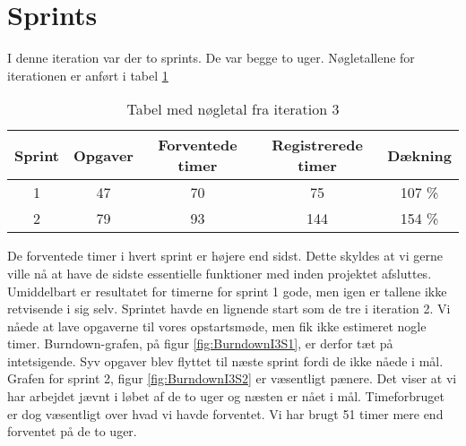 \section{Sprints}

I denne iteration var der to sprints. De var begge to uger.
Nøgletallene for iterationen er anført i tabel \ref{table:iteration3sprints}

\begin{table}
\centering
\begin{tabular}{|c|c|c|c|c|}
\hline 
\textbf{Sprint} 	& \textbf{Opgaver} 	& \textbf{Forventede timer} 	& \textbf{Registrerede timer} 	& \textbf{Dækning} \\ 
\hline
1 		& 47 		& 70 				& 75						& 107 \% \\ 
\hline 
2 		& 79 		& 93 				& 144					&  154 \% \\ 
\hline 
\end{tabular}
\caption{Tabel med nøgletal fra iteration 3}
\label{table:iteration3sprints}
\end{table}

De forventede timer i hvert sprint er højere end sidst. Dette skyldes at vi gerne ville nå at have de sidste essentielle funktioner med inden projektet afsluttes. Umiddelbart er resultatet for timerne for sprint 1 gode, men igen er tallene ikke retvisende i sig selv. Sprintet havde en lignende start som de tre i iteration 2. Vi nåede at lave opgaverne til vores opstartsmøde, men fik ikke estimeret nogle timer. Burndown-grafen, på figur \ref{fig:BurndownI3S1}, er derfor tæt på intetsigende. Syv opgaver blev flyttet til næste sprint fordi de ikke nåede i mål. Grafen for sprint 2, figur \ref{fig:BurndownI3S2} er væsentligt pænere. Det viser at vi har arbejdet jævnt i løbet af de to uger og næsten er nået i mål. Timeforbruget er dog væsentligt over hvad vi havde forventet. Vi har brugt 51 timer mere end forventet på de to uger.

\begin{minipage}{0.5\textwidth}
\end{minipage}
\begin{minipage}{0.5\textwidth}
\end{minipage}
